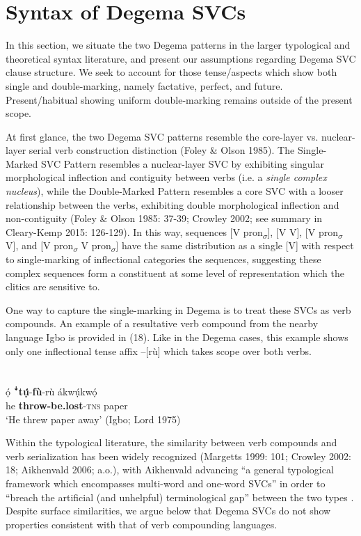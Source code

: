 \chapter{Syntax of Degema SVCs}

In this section, we situate the two Degema patterns in the larger typological and theoretical syntax literature, and present our assumptions regarding Degema SVC clause structure. We seek to account for those tense/aspects which show both single and double-marking, namely factative, perfect, and future. Present/habitual showing uniform double-marking remains outside of the present scope. 

At first glance, the two Degema SVC patterns resemble the core-layer vs. nuclear-layer serial verb construction distinction (Foley \& Olson 1985). The Single-Marked SVC Pattern resembles a nuclear-layer SVC by exhibiting singular morphological inflection and contiguity between verbs (i.e. a \textit{single complex nucleus}), while the Double-Marked Pattern resembles a core SVC with a looser relationship between the verbs, exhibiting double morphological inflection and non-contiguity (Foley \& Olson 1985: 37-39; Crowley 2002; see summary in Cleary-Kemp 2015: 126-129). In this way, sequences [V pron\textsubscript{$\sigma $}], [V V], [V pron\textsubscript{$\sigma $} V], and [V pron\textsubscript{$\sigma $} V pron\textsubscript{$\sigma $}] have the same distribution as a single [V] with respect to single-marking of inflectional categories the sequences, suggesting these complex sequences form a constituent at some level of representation which the clitics are sensitive to. 

One way to capture the single-marking in Degema is to treat these SVCs as verb compounds. An example of a resultative verb compound from the nearby language Igbo is provided in (18). Like in the Degema cases, this example shows only one inflectional tense affix –[rù] which takes scope over both verbs.

\chapter[]{}
\label{bkm:Ref436576739}\gll ọ́    ꜜ\textbf{tụ́}{}-\textbf{fù}{}-rù      ákwụ́kwọ́\\
     he  \textbf{throw-be.lost}{}-\textsc{tns}  paper\\
\glt ‘He threw paper away’ (Igbo; Lord 1975)
\z

Within the typological literature, the similarity between verb compounds and verb serialization has been widely recognized (Margetts 1999: 101; Crowley 2002: 18; Aikhenvald 2006; a.o.), with Aikhenvald advancing “a general typological framework which encompasses multi-word and one-word SVCs” in order to “breach the artificial (and unhelpful) terminological gap” between the two types \citep[38]{Aikhenvald2006}. Despite surface similarities, we argue below that Degema SVCs do not show properties consistent with that of verb compounding languages. 

